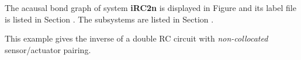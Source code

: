 

   The acausal bond graph of system \textbf{iRC2n} is
   displayed in Figure  and its label
   file is listed in Section .
   The subsystems are listed in Section .

This example gives the inverse of a double RC circuit with
\emph{non-collocated} sensor/actuator pairing.

